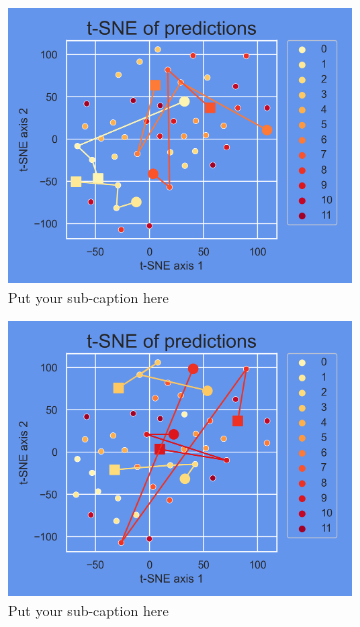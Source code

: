 \begin{figure}[ht]
	\begin{subfigure}{.5\textwidth}
		\centering
		\includegraphics[width=.9\linewidth]{./figs/preds_tSNE_0.png}  
		\caption{Put your sub-caption here}
		\label{fig:sub-first}
	\end{subfigure}
	\begin{subfigure}{.5\textwidth}
		\centering
		\includegraphics[width=.9\linewidth]{./figs/preds_tSNE_1.png}  
		\caption{Put your sub-caption here}
		\label{fig:sub-second}
	\end{subfigure}	
	\begin{subfigure}{.5\textwidth}
		\centering

\end{subfigure}
\end{figure}
